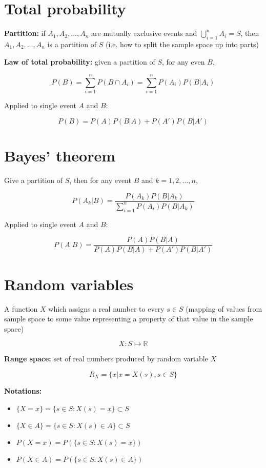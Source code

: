 \documentclass[twocolumn, 8pt]{extarticle}
\begin{document}
\section*{Total probability}\noindent

\textbf{Partition:} if $A_1, A_2, \ldots, A_n$ are mutually exclusive events and $\bigcup_{i = 1}^n A_i = S$, then $A_1, A_2, \ldots, A_n$ is a partition of $S$ (i.e. how to split the sample space up into parts)

\textbf{Law of total probability:} given a partition of $S$, for any even $B$,

$$
P(B) = \sum_{i=1}^n P(B \cap A_i) = \sum_{i=1}^n P(A_i)P(B|A_i)
$$

Applied to single event $A$ and $B$:

$$
P(B) = P(A)P(B|A) + P(A')P(B|A')
$$

\section*{Bayes' theorem}

Give a partition of $S$, then for any event $B$ and $k = 1, 2, \ldots, n$,

$$
P(A_k|B) = \frac{P(A_k)P(B|A_k)}{\sum_{i=1}^n P(A_i)P(B|A_k)}
$$

Applied to single event $A$ and $B$:

$$
P(A|B) = \frac{P(A)P(B|A)}{P(A)P(B|A) + P(A')P(B|A')}
$$

\section*{Random variables}

A function $X$ which assigns a real number to every $s \in S$ (mapping of values from sample space to some value representing a property of that value in the sample space)

$$
X : S \mapsto \mathbb{R}
$$

\textbf{Range space:} set of real numbers produced by random variable $X$

$$
R_X = \{x | x = X(s), s \in S\}
$$

\textbf{Notations:}

\begin{itemize}
    \item $\{X = x\} = \{s \in S : X(s) = x\} \subset S$
    \item $\{X \in A\} = \{s \in S : X(s) \in A\} \subset S$
    \item $P(X = x) = P(\{s \in S : X(s) = x\})$
    \item $P(X \in A) = P(\{s \in S : X(s) \in A\})$
\end{itemize}
\end{document}
